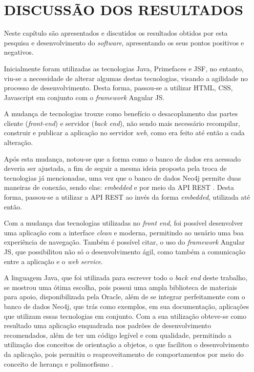 
\chapter{DISCUSSÃO DOS RESULTADOS} 

\par Neste capítulo são apresentados e discutidos os resultados obtidos por esta pesquisa e desenvolvimento do \textit{software}, apresentando os seus pontos positivos e negativos.

\par Inicialmente foram utilizadas as tecnologias Java, Primefaces e JSF, no entanto, viu-se a necessidade de alterar algumas destas tecnologias, visando a agilidade no processo de desenvolvimento. Desta forma, passou-se a utilizar HTML, CSS, Javascript em conjunto com o \textit{framework} Angular JS.

\par A mudança de tecnologias trouxe como benefício o desacoplamento das partes cliente (\textit{front-end}) e servidor (\textit{back end}), não sendo mais necessário recompilar, construir e publicar a aplicação no servidor \textit{web}, como era feito até então a cada alteração.

\par Após esta mudança, notou-se que a forma como o banco de dados era acessado deveria ser ajustada, a fim de seguir a mesma ideia proposta pela troca de tecnologias já mencionadas, uma vez que o banco de dados Neo4j permite duas maneiras de conexão, sendo elas: \textit{embedded} e por meio da API REST \cite{robinson_webber_eifrem_graph_databases}. Desta forma, passou-se a utilizar a API REST ao invés da forma \textit{embedded}, utilizada até então.

\par Com a mudança das tecnologias utilizadas no \textit{front end}, foi possível desenvolver uma aplicação com a interface \textit{clean} e moderna, permitindo ao usuário uma boa experiência de navegação. Também é possível citar, o uso do \textit{framework} Angular JS, que possibilitou não só o desenvolvimento ágil, como também a comunicação entre a aplicação e o \textit{web service}.

\par A linguagem Java, que foi utilizada para escrever todo o \textit{back end} deste trabalho, se mostrou uma ótima escolha, pois possui uma ampla biblioteca de materiais para apoio, disponibilizada pela Oracle, além de se integrar perfeitamente com o banco de dados Neo4j, que trás como exemplos, em sua documentação, aplicações que utilizam essas tecnologias em conjunto. Com a sua utilização obteve-se como resultado uma aplicação enquadrada nos padrões de desenvolvimento recomendados, além de ter um código legível e com qualidade, permitindo a utilização dos conceitos de orientação a objetos, o que facilitou o desenvolvimento da aplicação, pois permitiu o reaproveitamento de comportamentos por meio do conceito de herança e polimorfismo \cite{schildt_java_complete_reference}.

